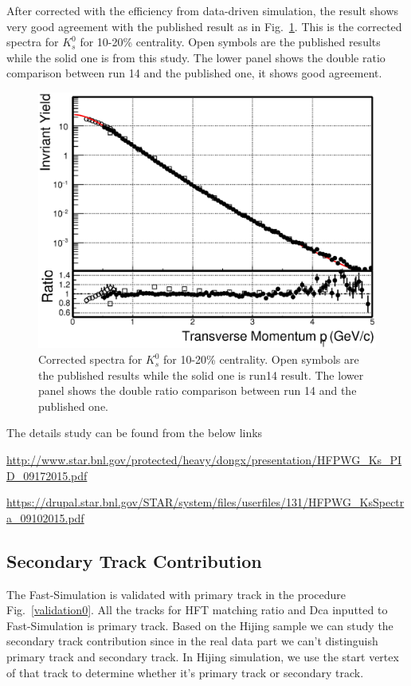  After corrected with the efficiency from data-driven simulation, the result shows very good agreement with the published result as in Fig.~\ref{Ks_spectra}. This is the corrected spectra for $K_{s}^{0}$ for 10-20\% centrality. Open symbols are the published results while the solid one is from this study. The lower panel shows the double ratio comparison between run 14 and the published one, it shows good agreement.

\begin{figure}
\centering
\includegraphics[width=0.7\columnwidth]{figure/Run14_D0HFT/Ks_spectra_PtCut_0.eps}
\caption{Corrected spectra for $K_{s}^{0}$ for 10-20\% centrality. Open symbols are the published results while the solid one is run14 result. The lower panel shows the double ratio comparison between run 14 and the published one.}
\label{Ks_spectra}
\end{figure}

The details study can be found from the below links

\url{http://www.star.bnl.gov/protected/heavy/dongx/presentation/HFPWG_Ks_PID_09172015.pdf}

\url{https://drupal.star.bnl.gov/STAR/system/files/userfiles/131/HFPWG_KsSpectra_09102015.pdf}

\subsection{\label{concern1} Secondary Track Contribution}

The Fast-Simulation is validated with primary track in the procedure Fig.~\ref{validation0}. All the tracks for HFT matching ratio and Dca inputted to Fast-Simulation is primary track. Based on the Hijing sample we can study the secondary track contribution since in the real data part we can't distinguish primary track and secondary track. In Hijing simulation, we use the start vertex of that track to determine whether it's primary track or secondary track.

